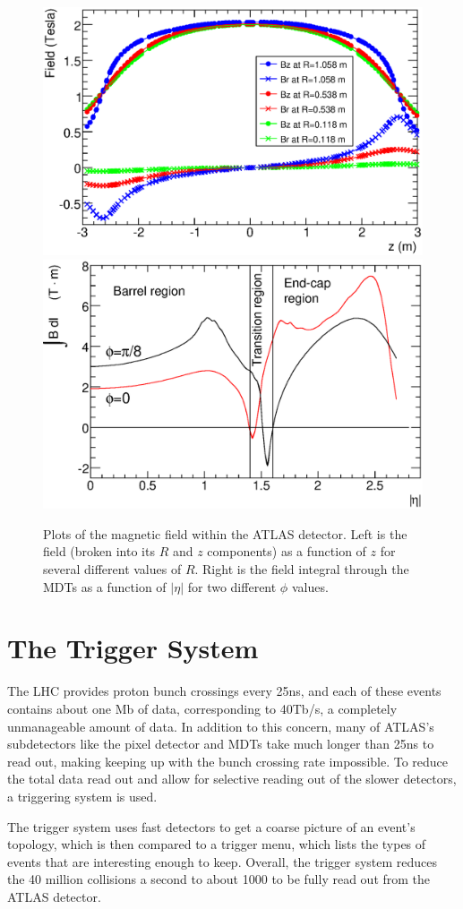 \begin{centering}
\begin{figure}[bth]
\myfloatalign
\includegraphics[width=.45\linewidth]{figures/atlas/solMeasB.eps}
\includegraphics[width=.45\linewidth]{figures/atlas/IBdl.eps}
\caption{Plots of the magnetic field within the ATLAS detector. Left is the field (broken into its $R$ and $z$ components) as a function of $z$ for several different values of $R$. Right is the field integral through the \acp{MDT} as a function of $|\eta|$ for two different $\phi$ values. }
\label{fig:bfield}
\end{figure}
\end{centering}

\section{The Trigger System}
\label{sec:Trigger}

The \ac{LHC} provides proton bunch crossings every 25ns, and each of these events contains about one Mb of data, corresponding to 40Tb/s, a completely unmanageable amount of data. In addition to this concern, many of ATLAS's subdetectors like the pixel detector and \acp{MDT} take much longer than 25ns to read out, making keeping up with the bunch crossing rate impossible. To reduce the total data read out and allow for selective reading out of the slower detectors, a triggering system is used. 

The trigger system uses fast detectors to get a coarse picture of an event's topology, which is then compared to a trigger menu, which lists the types of events that are interesting enough to keep. Overall, the trigger system reduces the 40 million collisions a second to about 1000 to be fully read out from the ATLAS detector. 

